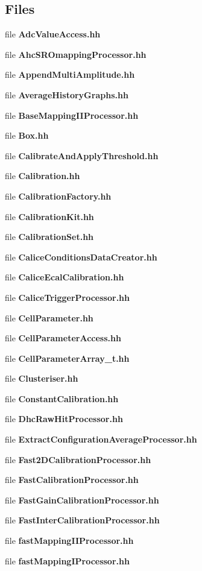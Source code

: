 \subsection*{Files}
\begin{DoxyCompactItemize}
\item 
file {\bfseries AdcValueAccess.hh}
\item 
file {\bfseries AhcSROmappingProcessor.hh}
\item 
file {\bfseries AppendMultiAmplitude.hh}
\item 
file {\bfseries AverageHistoryGraphs.hh}
\item 
file {\bfseries BaseMappingIIProcessor.hh}
\item 
file {\bfseries Box.hh}
\item 
file {\bfseries CalibrateAndApplyThreshold.hh}
\item 
file {\bfseries Calibration.hh}
\item 
file {\bfseries CalibrationFactory.hh}
\item 
file {\bfseries CalibrationKit.hh}
\item 
file {\bfseries CalibrationSet.hh}
\item 
file {\bfseries CaliceConditionsDataCreator.hh}
\item 
file {\bfseries CaliceEcalCalibration.hh}
\item 
file {\bfseries CaliceTriggerProcessor.hh}
\item 
file {\bfseries CellParameter.hh}
\item 
file {\bfseries CellParameterAccess.hh}
\item 
file {\bfseries CellParameterArray\_\-t.hh}
\item 
file {\bfseries Clusteriser.hh}
\item 
file {\bfseries ConstantCalibration.hh}
\item 
file {\bfseries DhcRawHitProcessor.hh}
\item 
file {\bfseries ExtractConfigurationAverageProcessor.hh}
\item 
file {\bfseries Fast2DCalibrationProcessor.hh}
\item 
file {\bfseries FastCalibrationProcessor.hh}
\item 
file {\bfseries FastGainCalibrationProcessor.hh}
\item 
file {\bfseries FastInterCalibrationProcessor.hh}
\item 
file {\bfseries fastMappingIIProcessor.hh}
\item 
file {\bfseries fastMappingIProcessor.hh}

\end{DoxyCompactItemize}
